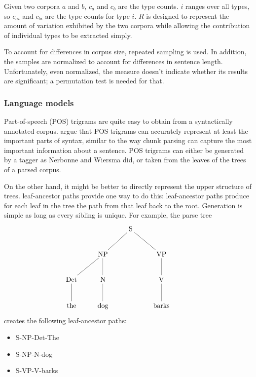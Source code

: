 \documentclass[11pt]{article}
\begin{document}
\noindent{}Given two corpora $a$ and $b$, $c_a$ and $c_b$ are the type
counts. $i$ ranges over all types, so $c_{ai}$ and $c_{bi}$ are the
type counts for type $i$.  $R$ is designed to represent the amount of
variation exhibited by the two corpora while allowing the contribution
of individual types to be extracted simply.

To account for differences in corpus size, repeated sampling is
used. In addition, the samples are normalized to account for
differences in sentence length.  Unfortunately, even normalized, the
measure doesn't indicate whether its results are significant; a
permutation test is needed for that.


\subsubsection{Language models}
Part-of-speech (POS) trigrams are quite easy to obtain from a syntactically
annotated corpus.  argue that POS trigrams
can accurately represent at least the important parts of syntax,
similar to the way chunk parsing can capture the most important
information about a sentence. POS trigrams can either be generated by
a tagger as Nerbonne and Wiersma did, or taken from the leaves of
the trees of a parsed corpus.

On the other hand, it might be better to directly represent the upper
structure of trees.  leaf-ancestor paths provide
one way to do this: leaf-ancestor paths produce for each leaf in the
tree the path from that leaf back to the root. Generation is
simple as long as every sibling is unique. For example, the parse tree
\[\xymatrix{
  &&\textrm{S} \ar@{-}[dl] \ar@{-}[dr] &&\\
  &\textrm{NP} \ar@{-}[d] \ar@{-}[dl] &&\textrm{VP} \ar@{-}[d]\\
  \textrm{Det} \ar@{-}[d] & \textrm{N} \ar@{-}[d] && \textrm{V} \ar@{-}[d] \\
\textrm{the}& \textrm{dog} && \textrm{barks}\\}
\]
creates the following leaf-ancestor paths:

\begin{itemize}
\item S-NP-Det-The
\item S-NP-N-dog
\item S-VP-V-barks
\end{itemize}
\end{document}
